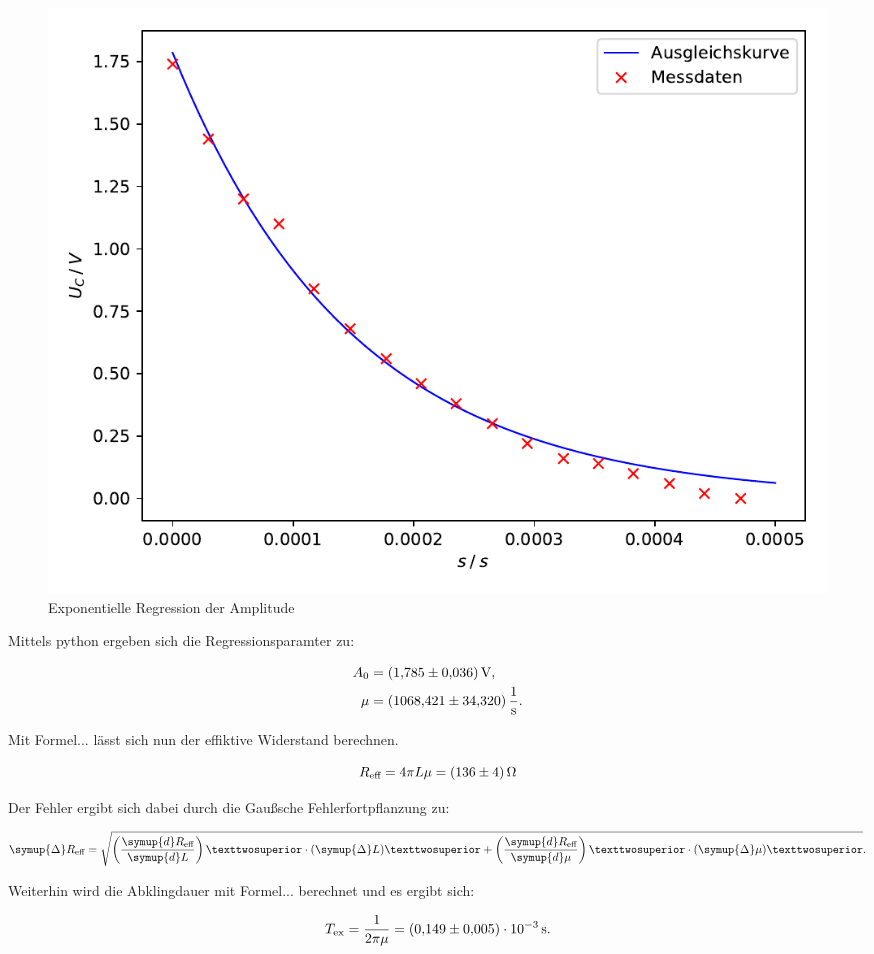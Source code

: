 \begin{figure}
  \centering
  \includegraphics[scale=0.8]{content/plot1.pdf}
  \caption{Exponentielle Regression der Amplitude}
  \label{fig:gedämpft}
\end{figure}

Mittels python ergeben sich die Regressionsparamter zu: 

\begin{align*}
A_0 &= \SI{1.785+-0.036}{\volt},\\
\mu &= \SI{1068.421+-34.320}{\per\second}.
\end{align*}

Mit Formel... lässt sich nun der effiktive Widerstand berechnen.

\begin{equation*}
R_\text{eff} = 4\pi L\mu = \SI{136+-4}{\ohm}
\end{equation*}

Der Fehler ergibt sich dabei durch die Gaußsche Fehlerfortpflanzung zu: 

\begin{equation*}
\symup{\Delta} R_\text{eff} = \sqrt{\left(\frac{\symup{d}R_\text{eff}}{\symup{d}L}\right)²\cdot (\symup{\Delta}L)² +
\left(\frac{\symup{d}R_\text{eff}}{\symup{d}\mu}\right)²\cdot (\symup{\Delta}\mu)²}.
\end{equation*}

Weiterhin wird die Abklingdauer mit Formel... berechnet und 
es ergibt sich:

\begin{equation*}
T_\text{ex} = \frac{1}{2\pi\mu} = \SI{0.149+-0.005e-3}{\second}.
\end{equation*}

